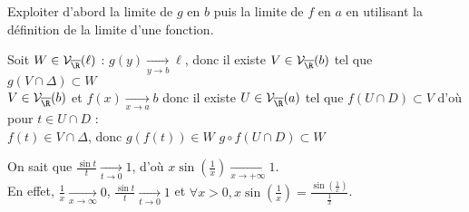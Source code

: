 \documentclass[12pt,a4paper]{report}
\begin{document}
\begin{principedemo}
Exploiter d'abord la limite de $g$ en $b$ puis la limite de $f$ en $a$ en utilisant la définition de la limite d'une fonction.
\end{principedemo}

\begin{demo}
Soit $W \in \mathcal{V}_{\overline{\R}}(\ell)$ : $g(y) \xrightarrow[y \to b]{} \ell$, donc il existe $V \in \mathcal{V}_{\overline{\R}}(b)$ tel que $g(V \cap \Delta) \subset W$ \\
$V \in \mathcal{V}_{\overline{\R}}(b)$ et $f(x) \xrightarrow[x \to a]{} b$ donc il existe $U \in \mathcal{V}_{\overline{\R}}(a)$ tel que $f(U \cap D) \subset V$ d'où pour $t \in U \cap D$ : \\
$f(t) \in V \cap \Delta$, donc $g(f(t)) \in W$ \ie $g \circ f(U \cap D) \subset W$
\end{demo}


\begin{exemple}
On sait que $\frac{\sin t}{t} \xrightarrow[t \to 0]{} 1$, d'où $x\sin\left(\frac{1}{x}\right) \xrightarrow[x \to +\infty]{} 1$. \\
En effet, $\frac{1}{x} \xrightarrow[x \to \infty]{} 0$, \quad $\frac{\sin t}{t} \xrightarrow[t \to 0]{} 1$ \quad et $\forall x > 0, x\sin\left(\frac{1}{x}\right) = \frac{\sin\left(\frac{1}{x}\right)}{\frac{1}{x}}$.
\end{exemple}
\end{document}
